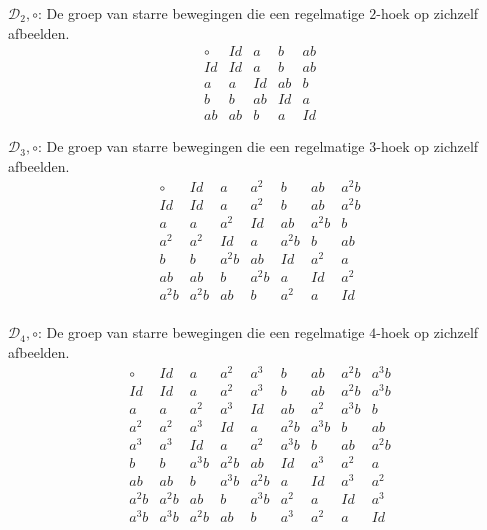 \documentclass[main.tex]{subfiles}
\begin{document}
\begin{vb}
  $\mathcal{D}_{2},\circ$: De groep van starre bewegingen die een regelmatige $2$-hoek op zichzelf afbeelden.
  \[
  \begin{array}{c|cccccc}
    \circ & Id & a & b & ab\\
    \hline
    Id & Id & a & b & ab\\
    a & a & Id & ab & b\\
    b & b & ab & Id & a\\
    ab & ab & b & a & Id
  \end{array}
  \]
\commj
\end{vb}

\begin{vb}
  $\mathcal{D}_{3},\circ$: De groep van starre bewegingen die een regelmatige $3$-hoek op zichzelf afbeelden.
  \[
  \begin{array}{c|cccccc}
    \circ & Id & a & a^{2} & b & ab & a^{2}b\\
    \hline
    Id & Id & a & a^{2} & b & ab & a^{2}b \\
    a & a & a^{2} & Id & ab & a^{2}b & b \\
    a^{2} & a^{2} & Id & a & a^{2}b & b & ab \\
    b & b & a^{2}b & ab & Id & a^{2} & a \\
    ab & ab & b & a^{2}b & a & Id & a^{2} \\
    a^{2}b & a^{2}b & ab & b & a^{2} & a & Id \\
  \end{array}
  \]
\end{vb}

\begin{vb}
  $\mathcal{D}_{4},\circ$: De groep van starre bewegingen die een regelmatige $4$-hoek op zichzelf afbeelden.
  \[
  \begin{array}{c|cccccccc}
    \circ & Id & a & a^{2} & a^{3} & b & ab & a^{2}b & a^{3}b \\
    \hline
    Id & Id & a  & a^{2} & a^{3} & b & ab & a^{2}b & a^{3}b \\
    a & a & a^{2} & a^{3} & Id & ab & a^{2} & a^{3}b & b \\
    a^{2} & a^{2} & a^{3} & Id & a & a^{2}b & a^{3}b & b & ab \\
    a^{3} & a^{3} & Id & a & a^{2} & a^{3}b & b & ab & a^{2}b \\
    b & b & a^{3}b & a^{2}b & ab & Id & a^{3} & a^{2} & a \\
    ab & ab & b & a^{3}b & a^{2}b & a & Id & a^{3} & a^{2} \\
    a^{2}b & a^{2}b & ab & b & a^{3}b & a^{2} & a & Id & a^{3} \\
    a^{3}b & a^{3}b & a^{2}b & ab & b & a^{3} & a^{2} & a & Id \\
  \end{array}
  \]
\end{vb}
\end{document}
